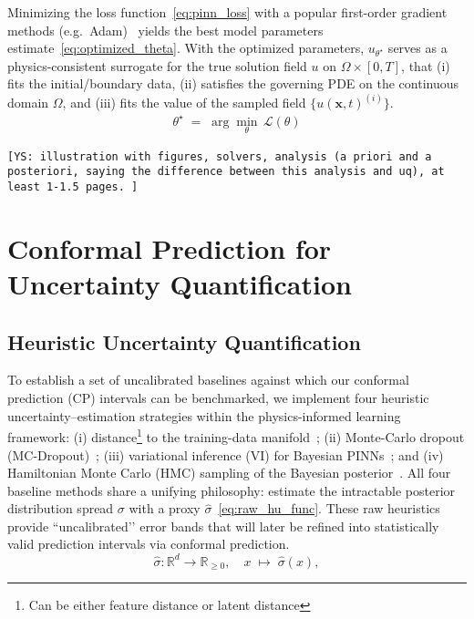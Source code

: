 \documentclass[preprint,12pt]{elsarticle}
\newcommand{\cys}[1]{{\small \color{blue} \tt [YS: #1]}}
\begin{document}
Minimizing the loss function~\eqref{eq:pinn_loss} with a popular first-order gradient methods (e.g.\ Adam)~\cite{kingma_adam_2017} yields the best model parameters estimate~\eqref{eq:optimized_theta}. With the optimized parameters, $u_{\theta^{\star}}$ serves as a physics-consistent surrogate for the true solution field $u$ on $\Omega\times[0,T]$, that (i) fits the initial/boundary data, (ii) satisfies the governing PDE on the continuous domain $\Omega$, and (iii) fits the value of the sampled field $\{u(\mathbf{x},t)^{(i)}\}$. 
\begin{align}
    \theta^{\star} \;=\; 
    \arg\min_{\theta} \,\mathcal{L}(\theta)
    \label{eq:optimized_theta}
\end{align}

\cys{illustration with figures, solvers, analysis (a priori and a posteriori, saying the difference between this analysis and uq), at least 1-1.5 pages. }


\section{Conformal Prediction for Uncertainty Quantification}
\label{sec:cp}

\subsection{Heuristic Uncertainty Quantification}
\label{sec:sub:original_uq}

To establish a set of uncalibrated baselines against which our conformal prediction (CP) intervals can be benchmarked, we implement four heuristic uncertainty–estimation strategies within the physics-informed learning framework:  
(i) distance\footnote{Can be either feature distance or latent distance} to the training-data manifold~\cite{hu_robust_2022};  
(ii) Monte-Carlo dropout (MC-Dropout)~\cite{gal_dropout_2016};  
(iii) variational inference (VI) for Bayesian PINNs~\cite{yang_b-pinns_2021}; and  
(iv) Hamiltonian Monte Carlo (HMC) sampling of the Bayesian posterior~\cite{yang_b-pinns_2021}. All four baseline methods share a unifying philosophy: estimate the intractable posterior distribution spread $\sigma$ with a proxy $\hat\sigma$~\eqref{eq:raw_hu_func}.
These raw heuristics provide “uncalibrated’’ error bands that will later be refined into statistically valid prediction intervals via conformal prediction.
\begin{equation}
  \hat{\sigma}:\mathbb{R}^{d}\!\longrightarrow\!\mathbb{R}_{\ge 0},
  \quad x \;\mapsto\; \hat{\sigma}(x),
  \label{eq:raw_hu_func}
\end{equation}
\end{document}
